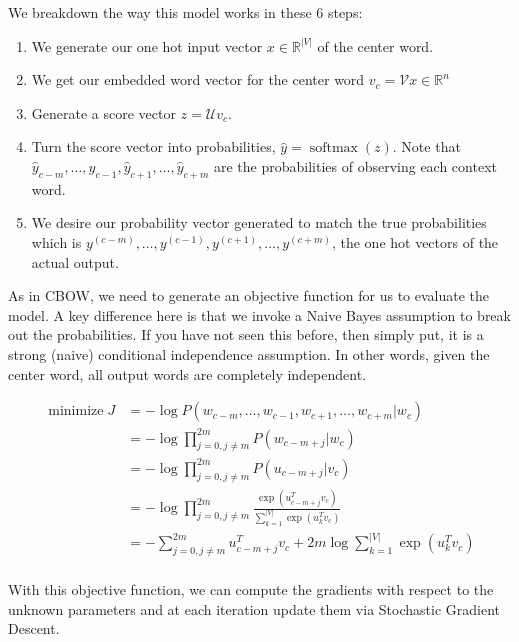 \documentclass[nobib]{tufte-handout}
\begin{document}
We breakdown the way this model works in these 6 steps:
\begin{enumerate}
\item We generate our one hot input vector $x \in \mathbb{R}^{|V|} $ of the center word.
\item We get our embedded word vector for the center word $v_{c} =\mathcal{V}x \in \mathbb{R}^n $
\item Generate a score vector $ z = \mathcal{U} v_{c} $. 
\item Turn the score vector into probabilities, $\hat{y} = \operatorname{softmax}(z)$. Note that $\hat{y}_{c-m}, \hdots, \hat{y}_{c-1}, \hat{y}_{c+1}, \hdots, \hat{y}_{c+m}$ are the probabilities of observing each context word.
\item We desire our probability vector generated to match the true probabilities which is
$y^{(c-m)}, \hdots, y^{(c-1)}, y^{(c+1)}, \hdots, y^{(c+m)}$, the one hot vectors of the actual output.
\end{enumerate}

As in CBOW, we need to generate an objective function for us to evaluate the model. A key difference here is that we invoke a Naive Bayes assumption to break out the probabilities. If you have not seen this before, then simply put, it is a strong (naive) conditional independence assumption. In other words, given the center word, all output words are completely independent.



\begin{align*}
\operatorname{minimize} J &= -\log P(w_{c-m}, \hdots, w_{c-1}, w_{c+1}, \hdots, w_{c+m}|w_{c})\\
&= -\log \prod_{j=0, j\neq m}^{2m} P(w_{c-m+j}|w_{c})\\
&= -\log \prod_{j=0, j\neq m}^{2m} P(u_{c-m+j}|v_{c})\\
&= -\log \prod_{j=0, j\neq m}^{2m} \frac{\exp(u_{c-m+j}^{T}v_{c})}{\sum_{k=1}^{|V|}\exp(u_{k}^{T}v_{c})}\\
&= -\sum_{j=0, j\neq m}^{2m} u_{c-m+j}^{T}v_{c} + 2m\log \sum_{k=1}^{|V|}\exp(u_{k}^{T}v_{c})\\
\end{align*}

With this objective function, we can compute the gradients with respect to the unknown
parameters and at each iteration update them via Stochastic Gradient Descent.
\end{document}
